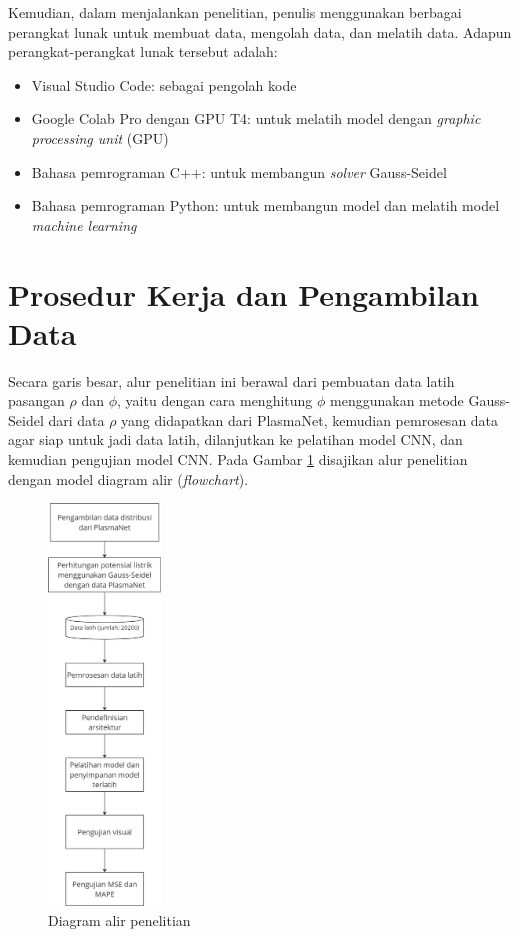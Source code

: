 Kemudian, dalam menjalankan penelitian, penulis menggunakan berbagai perangkat lunak
untuk membuat data, mengolah data, dan melatih data. Adapun perangkat-perangkat
lunak tersebut adalah:
\begin{itemize}
  \item Visual Studio Code: sebagai pengolah kode

  \item Google Colab Pro dengan GPU T4: untuk melatih model dengan \emph{graphic
    processing unit} (GPU)

  \item Bahasa pemrograman C++: untuk membangun \emph{solver} Gauss-Seidel

  \item Bahasa pemrograman Python: untuk membangun model dan melatih model \emph{machine
    learning}
\end{itemize}

\section{Prosedur Kerja dan Pengambilan Data}
Secara garis besar, alur penelitian ini berawal dari pembuatan data latih pasangan
$\rho$ dan $\phi$, yaitu dengan cara menghitung $\phi$ menggunakan metode Gauss-Seidel
dari data $\rho$ yang didapatkan dari PlasmaNet, kemudian pemrosesan data agar siap
untuk jadi data latih, dilanjutkan ke pelatihan model CNN, dan kemudian pengujian
model CNN. Pada Gambar \ref{flowchart} disajikan alur penelitian dengan model
diagram alir (\emph{flowchart}).

\begin{figure}[h!]
  \label{flowchart}
  \centering
  \includegraphics[width=3cm, scale=0.5]{gambar/flowchart2.jpg}
  \caption{Diagram alir penelitian}
  \label{flowchart}
\end{figure}

